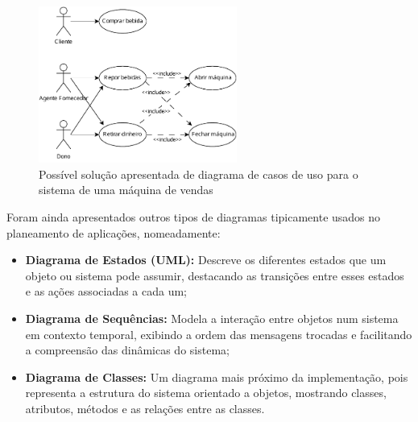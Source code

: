       \begin{figure}[H]
          \centering
          \includegraphics[width=0.58\textwidth]{imgs/UseCaseDiagramVendingMachine3.drawio.pdf}
          \caption{Possível solução apresentada de diagrama de casos de uso para o sistema de uma máquina de vendas}\label{fig:vending_machine}
      \end{figure}

      Foram ainda apresentados outros tipos de diagramas tipicamente usados no planeamento de aplicações, nomeadamente:
      \begin{itemize}
          \item \textbf{Diagrama de Estados (UML):} Descreve os diferentes estados que um objeto ou sistema pode assumir, destacando as transições entre esses estados e as ações associadas a cada um;
          
          \item \textbf{Diagrama de Sequências:} Modela a interação entre objetos num sistema em contexto temporal, exibindo a ordem das mensagens trocadas e facilitando a compreensão das dinâmicas do sistema;

          \item \textbf{Diagrama de Classes:} Um diagrama mais próximo da implementação, pois representa a estrutura do sistema orientado a objetos, mostrando classes, atributos, métodos e as relações entre as classes.
      \end{itemize}    

